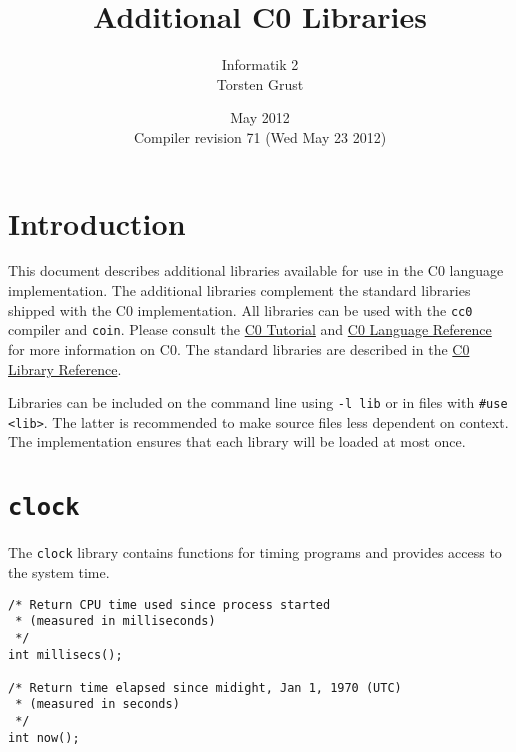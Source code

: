 \documentclass[11pt]{article}
\title{Additional C0 Libraries}
\author{Informatik 2 \\ Torsten Grust}
\date{May 2012\\Compiler revision 71 (Wed May 23 2012)}
\begin{document}
\maketitle

\section{Introduction}

This document describes additional libraries available for use in the
C0 language implementation. The additional libraries complement the
standard libraries shipped with the C0 implementation. All libraries
can be used with the \verb'cc0' compiler and \verb'coin'.  Please
consult the \href{http://c0.typesafety.net/tutorial}{C0 Tutorial} and
\href{http://c0.typesafety.net/doc/c0-reference.pdf}{C0 Language
  Reference} for more information on C0. The standard libraries are
described in the \href{http://c0.typesafety.net/tutorial}{C0 Library
  Reference}.

Libraries can be included on the command line using \verb'-l lib' or in
files with \verb'#use <lib>'.  The latter is recommended to make
source files less dependent on context.  The implementation ensures
that each library will be loaded at most once.

\section{\tt clock}
\label{sec:tt-clock}


The \verb'clock' library contains functions for timing programs and
provides access to the system time.

\begin{small}
\begin{verbatim}
/* Return CPU time used since process started
 * (measured in milliseconds)
 */
int millisecs();

/* Return time elapsed since midight, Jan 1, 1970 (UTC)
 * (measured in seconds)
 */
int now();
\end{verbatim}
\end{small}
\end{document}

